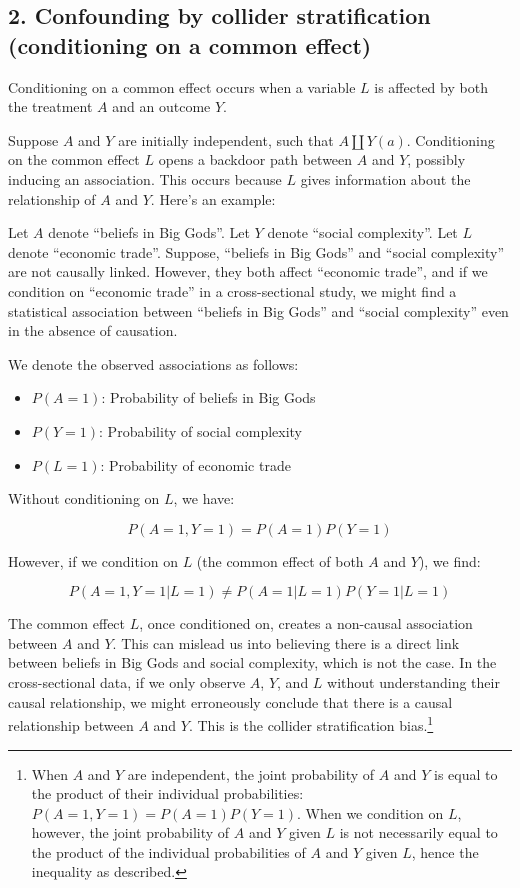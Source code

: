 \documentclass[
  singlecolumn]{report}
\providecommand{\tightlist}{%
  \setlength{\itemsep}{0pt}\setlength{\parskip}{0pt}}\usepackage{longtable,booktabs,array}
\begin{document}
\hypertarget{confounding-by-collider-stratification-conditioning-on-a-common-effect}{%
\subsection{2. Confounding by collider stratification (conditioning on a
common
effect)}\label{confounding-by-collider-stratification-conditioning-on-a-common-effect}}

Conditioning on a common effect occurs when a variable \(L\) is affected
by both the treatment \(A\) and an outcome \(Y\).

Suppose \(A\) and \(Y\) are initially independent, such that
\(A \coprod Y(a)\). Conditioning on the common effect \(L\) opens a
backdoor path between \(A\) and \(Y\), possibly inducing an association.
This occurs because \(L\) gives information about the relationship of
\(A\) and \(Y\). Here's an example:

Let \(A\) denote ``beliefs in Big Gods''. Let \(Y\) denote ``social
complexity''. Let \(L\) denote ``economic trade''. Suppose, ``beliefs in
Big Gods'' and ``social complexity'' are not causally linked. However,
they both affect ``economic trade'', and if we condition on ``economic
trade'' in a cross-sectional study, we might find a statistical
association between ``beliefs in Big Gods'' and ``social complexity''
even in the absence of causation.

We denote the observed associations as follows:

\begin{itemize}
\tightlist
\item
  \(P(A = 1)\): Probability of beliefs in Big Gods
\item
  \(P(Y = 1)\): Probability of social complexity
\item
  \(P(L = 1)\): Probability of economic trade
\end{itemize}

Without conditioning on \(L\), we have:

\[P(A = 1, Y = 1) = P(A = 1)P(Y = 1)\]

However, if we condition on \(L\) (the common effect of both \(A\) and
\(Y\)), we find:

\[P(A = 1, Y = 1 | L = 1) \neq P(A = 1 | L = 1)P(Y = 1 | L = 1)\]

The common effect \(L\), once conditioned on, creates a non-causal
association between \(A\) and \(Y\). This can mislead us into believing
there is a direct link between beliefs in Big Gods and social
complexity, which is not the case. In the cross-sectional data, if we
only observe \(A\), \(Y\), and \(L\) without understanding their causal
relationship, we might erroneously conclude that there is a causal
relationship between \(A\) and \(Y\). This is the collider
stratification bias.\footnote{When \(A\) and \(Y\) are independent, the
  joint probability of \(A\) and \(Y\) is equal to the product of their
  individual probabilities: \(P(A = 1, Y = 1) = P(A = 1)P(Y = 1)\). When
  we condition on \(L\), however, the joint probability of \(A\) and
  \(Y\) given \(L\) is not necessarily equal to the product of the
  individual probabilities of \(A\) and \(Y\) given \(L\), hence the
  inequality as described.}
\end{document}
